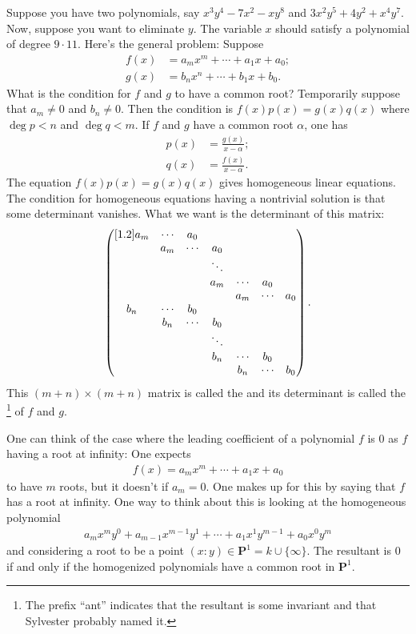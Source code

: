 \documentclass [11 pt, oneside, margin = 1 in] {article}
\begin{document}
		Suppose you have two polynomials, say $x^3y^4 - 7x^2-xy^8$ and $3x^2y^5+4y^2+x^4y^7$. Now, suppose you want to eliminate $y$. The variable $x$ should satisfy a polynomial of degree $9\cdot 11$. Here's the general problem: Suppose
		\begin{align*}
			f(x)&=a_mx^m+\cdots +  a_1x+a_0;\\
			g(x)&=b_nx^n+\cdots +  b_1x+b_0.
		\end{align*}
What is the condition for $f$ and $g$ to have a common root? Temporarily suppose that $a_m\ne 0$ and $b_n\ne 0$. Then the condition is $f(x)p (x)=g (x)q (x)$ where $\deg p<n$ and $\deg q<m$. If $f$ and $g$ have a common root $\alpha$, one has
\begin{align*}
	p(x)&= \frac{g(x)}{x-\alpha};\\
	q(x)&= \frac{f(x)}{x-\alpha}.
\end{align*}
The equation $f(x)p (x)=g (x)q (x)$ gives homogeneous linear equations. The condition for homogeneous equations having a nontrivial solution is that some determinant vanishes. What we want is the determinant of this matrix:
\begin{align*}
	\begin{pmatrix} [ 1.2 ] a_m & \cdots & a_0 && &&\\ & a_m & \cdots & a_0& &&\\ &&&\ddots&&&\\&&&a_m & \cdots & a_0\\&&&&a_m & \cdots & a_0\\b_n & \cdots & b_0 && &&\\ & b_n & \cdots & b_0& &&\\ &&&\ddots&&&\\&&&b_n & \cdots & b_0\\&&&&b_n & \cdots & b_0 \end{pmatrix}.
\end{align*}
This $ (m+n)\times  (m+n)$ matrix is called the  and its determinant is called the \footnote{The prefix ``ant'' indicates that the resultant is some invariant and that Sylvester probably named it.} of $f$ and $g$.

\begin{remark}\label{ifffffffffff}
	One can think of the case where the leading coefficient of a polynomial $f$ is $0$ as $f$ having a root at infinity: One expects
	\begin{align*}
		f(x) = a_mx^m+\cdots+a_1x+a_0
	\end{align*}
	to have $m$ roots, but it doesn't if $a_m=0$. One makes up for this by saying that $f$ has a root at infinity. One way to think about this is looking at the homogeneous polynomial
	\begin{align*}
		a_mx^my^0 + a_{m-1}x^{m-1}y^1+\cdots +a_1x^1y^{m-1} +a_0x^0y^m
	\end{align*}
	and considering a root to be a point $(x:y)\in  \mathbf{P}^1 = k\cup \{\infty\}$. The resultant is $0$ if and only if the homogenized polynomials have a common root in $\mathbf{P}^1$.
\end{remark}
\end{document}
